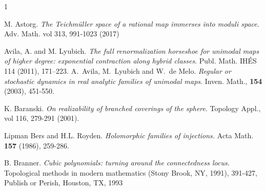 \documentclass{amsart}
\numberwithin{equation}{section}
\theoremstyle{definition}
\theoremstyle{remark}
\begin{document}
\begin{thebibliography}{1}


 M. Astorg. {\em The Teichm\"uller space of a rational map immerses 
into moduli space.} Adv. Math. vol 313, 991-1023 (2017)

Avila, A. and M. Lyubich. {\em The full renormalization horseshoe for unimodal maps of higher degree: exponential contraction along hybrid classes}.  Publ. Math. IHÉS 114 (2011), 171–223.
 A.\ Avila,  M.\ Lyubich and W.\ de Melo. {\em Regular or stochastic dynamics in real analytic families of unimodal maps}. Inven.  Math., {\bf 154} (2003), 451-550.


 K. Baranski. {\em On realizability of branched coverings of the sphere}. Topology Appl., vol 116, 279-291 (2001).

 Lipman Bers and H.L. Royden. {\em Holomorphic families of injections.}
Acta Math. {\bf 157} (1986), 259-286.

 B. Branner. {\em Cubic polynomials: turning around the connectedness locus.} Topological methods in modern mathematics 
    ({S}tony {B}rook, {NY}, 1991), 391-427, Publish or Perish, Houston, TX, 1993


\end{thebibliography}
\end{document}
